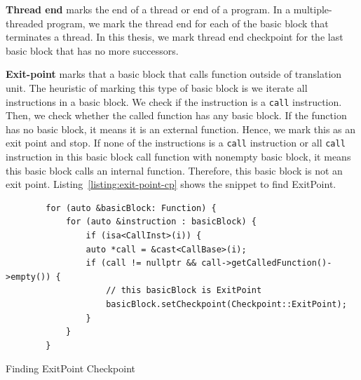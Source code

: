 \vspace{0.5cm}
\noindent \textbf{Thread end} marks the end of a thread or end of a program. In
a multiple-threaded program, we mark the thread end for each of the basic block
that terminates a thread. In this thesis, we mark thread end checkpoint for the
last basic block that has no more successors.

\vspace{0.5cm}
\noindent \textbf{Exit-point} marks that a basic block that calls function
outside of translation unit. The heuristic of marking this type of basic block
is we iterate all instructions in a basic block. We check if the instruction is
a \texttt{call} instruction. Then, we check whether the called function has any
basic block. If the function has no basic block, it means it is an external
function. Hence, we mark this as an exit point and stop. If none of the
instructions is a \texttt{call} instruction or all \texttt{call} instruction in
this basic block call function with nonempty basic block, it means this basic
block calls an internal function. Therefore, this basic block is not an exit
point. Listing~\ref{listing:exit-point-cp} shows the snippet to find ExitPoint.

\begin{listing}[ht!]
    \begin{verbatim}
        for (auto &basicBlock: Function) {
            for (auto &instruction : basicBlock) {
                if (isa<CallInst>(i)) {
                auto *call = &cast<CallBase>(i);
                if (call != nullptr && call->getCalledFunction()->empty()) {
                    // this basicBlock is ExitPoint
                    basicBlock.setCheckpoint(Checkpoint::ExitPoint);
                } 
            }
        } 
    \end{verbatim}
    \caption{Finding ExitPoint Checkpoint}    
    \label{listing:exit-point-cp}
\end{listing}

